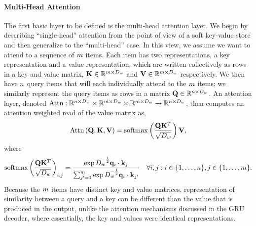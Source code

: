 \paragraph{Multi-Head Attention} The first basic layer to be defined is the 
multi-head attention layer. We begin by describing ``single-head'' attention
from the point of view of a soft key-value store and then generalize to 
the ``multi-head'' case. In this view, we assume we want to attend to 
a sequence of $m$ items. Each item has two representations,
a key representation and a value representation, which are written collectively
as rows in a key and value matrix, $\mathbf{K} \in \mathbb{R}^{m \times D_{w}}$
and $\mathbf{V} \in \mathbb{R}^{m \times D_{w}}$ respectively.
We then  have $n$ query items that will each individually attend to the 
$m$ items; we similarly represent the query items as rows in a matrix
$\mathbf{Q} \in \mathbb{R}^{n \times D_{w}}$. An attention
layer, denoted $\operatorname{Attn} : \mathbb{R}^{n \times D_{w}} \times \mathbb{R}^{m \times D_{w}} \times \mathbb{R}^{m \times D_{w}} \rightarrow \mathbb{R}^{n \times D_{w}}$, then computes an attention weighted read of the value
matrix as,
  \[\operatorname{Attn}\left(\mathbf{Q}, \mathbf{K}, \mathbf{V}\right) = \operatorname*{softmax}\left(\frac{\mathbf{Q} \mathbf{K}^T}{\sqrt{D_{w}}} \right)\mathbf{V}, \]
  where \[\operatorname*{softmax}\left(\frac{\mathbf{Q} \mathbf{K}^T}{\sqrt{D_{w}}} \right)_{i,j} = \frac{\exp D_{w}^{-\frac{1}{2}} \mathbf{q}_i \cdot \mathbf{k}_j }{ \sum_{j^\prime=1}^{m} \exp D_{w}^{-\frac{1}{2}} \mathbf{q}_i \cdot \mathbf{k}_{j^\prime}} \quad \forall i,j : i \in \{1,\ldots,n\}, j \in \{1,\ldots,m\}.\]
  Because the $m$ items have distinct key and value matrices,
  representation of similarity between a query and a key can be different
  than the value that is produced in the output, unlike the attention
  mechanisms discussed in the GRU decoder, where essentially, the key
  and values were identical representations.


